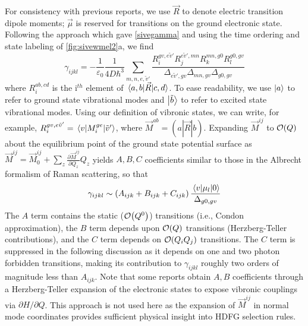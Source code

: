 \documentclass[aip, jcp, reprint, onecolumn, nofootinbib]{revtex4-2}
\begin{document}
For consistency with previous reports, we use $\vec{R}$ to denote electric transition dipole moments; $\vec{\mu}$ is reserved for transitions on the ground electronic state. \cite{Tang1970}
Following the approach which gave \autoref{sivegamma} and using the time ordering and state labeling of \autoref{fig:sivewmel2}a, we find
\begin{equation}\label{drgamma_notaylor}
	\gamma_{ijkl} = -\frac{1}{\varepsilon_0} \frac{1}{4D \hbar^3} \sum_{m,n,e,\tilde{v}'} \frac{
		R_{i}^{gv, e\tilde{v}'} 
		R_{j}^{e\tilde{v}',mn} 
		R_{k}^{mn,g0} 
		R_{l}^{g0,gv} 
	}{	\Delta_{e\tilde{v}', gv}
		\Delta_{mn, gv}
		\Delta_{g0,gv}
	}
\end{equation}
where $R_{i}^{ab,cd}$ is the i$^{th}$ element of $\mel{a,b}{\vec{R}}{c,d}$.
To ease readability, we use $\ket{a}$ to refer to ground state vibrational modes and $\ket{\tilde{b}}$ to refer to excited state vibrational modes.
Using our definition of vibronic states, we can write, for example,
$R_{i}^{gv,e\tilde{v}'} = \mel{v}{M_i^{ge}}{\tilde{v}'}$, where $\vec{M}^{ab} = (a|\vec{R}|b)$.\cite{Ziegler1974}
Expanding $\vec{M}^{ij}$ to $\order{Q}$ about the equilibrium point of the ground state potential surface as
$\vec{M}^{ij} = \vec{M}^{ij}_0 + \sum_z \frac{\partial\vec{M}^{ij}}{\partial Q_z} Q_z$
yields $A, B, C$ coefficients similar to those in the Albrecht formalism of Raman scattering, \cite{Albrecht1961, Warshel1977, Ziegler1988} so that
\begin{equation}\label{gammaabc}
		\gamma_{ijkl} \sim \left(A_{ijk} + B_{ijk} + C_{ijk}\right) \frac{\mel{v}{\mu_{l}}{0}} {\Delta_{g0,gv}}
\end{equation}
The $A$ term contains the static ($\order{Q^0}$) transitions (i.e., Condon approximation), the $B$ term depends upon $\order{Q}$ transitions (Herzberg-Teller contributions), and the $C$ term depends on $\order{Q_i Q_j}$ transitions. 
The $C$ term is suppressed in the following discussion as it depends on one and two photon forbidden transitions, making its contribution to $\gamma_{ijkl}$ roughly two orders of magnitude less than $A_{ijk}$. \cite{Ziegler1988, Neddersen1989, Bonang1992}
Note that some reports obtain $A, B$ coefficients through a Herzberg-Teller expansion of the electronic states to expose vibronic couplings via $\partial H / \partial Q$.\cite{HerzbergTeller1933, Petrov1985, Neddersen1989, Baranov1990}
This approach is not used here as the expansion of $\vec{M}^{ij}$ in normal mode coordinates provides sufficient physical insight into HDFG selection rules. 
\end{document}
